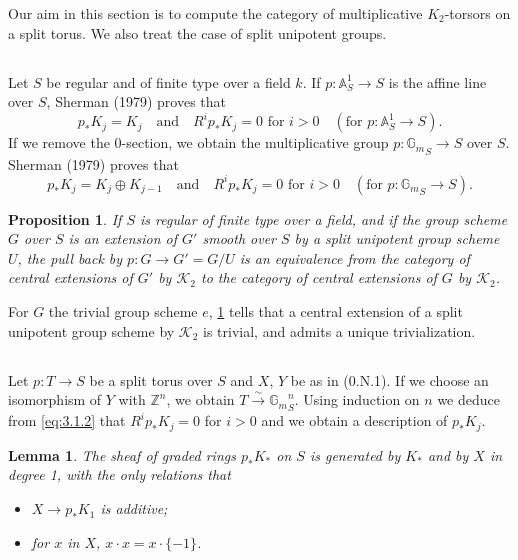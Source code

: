 \documentclass[11pt,a4paper]{article}
\theoremstyle{plain}
\newtheorem{lemma}[theorem]{Lemma}
\newtheorem{proposition}[theorem]{Proposition}
\theoremstyle{definition}
\newcommand{\cK}{\mathcal{K}}
\newcommand{\bA}{\mathbb{A}}
\newcommand{\bZ}{\mathbb{Z}}
\newcommand{\Gm}{{\mathbb{G}_m}}
\begin{document}
Our aim in this section is to compute the category of multiplicative $K_2$-torsors on a split torus. We also treat the case of split unipotent groups.

\subsection{}
Let $S$ be regular and of finite type over a field $k$. If $p: \bA^1_S \to S$ is the affine line over $S$, Sherman (1979) proves that
\begin{equation}\label{eq:3.1.1}
p_* K_j = K_j \quad \text{and} \quad R^i p_* K_j = 0 \text{ for } i > 0 \quad (\text{for } p: \bA^1_S \to S).
\end{equation}
If we remove the 0-section, we obtain the multiplicative group $p: \Gm_S \to S$ over $S$. Sherman (1979) proves that
\begin{equation}\label{eq:3.1.2}
p_* K_j = K_j \oplus K_{j-1} \quad \text{and} \quad R^i p_* K_j = 0 \text{ for } i > 0 \quad (\text{for } p: \Gm_S \to S).
\end{equation}

\begin{proposition}\label{prop:3.2}
If $S$ is regular of finite type over a field, and if the group scheme $G$ over $S$ is an extension of $G'$ smooth over $S$ by a split unipotent group scheme $U$, the pull back by $p: G \to G' = G/U$ is an equivalence from the category of central extensions of $G'$ by $\cK_2$ to the category of central extensions of $G$ by $\cK_2$.
\end{proposition}

For $G$ the trivial group scheme $e$, \ref{prop:3.2} tells that a central extension of a split unipotent group scheme by $\cK_2$ is trivial, and admits a unique trivialization.

\subsection{}
Let $p: T \to S$ be a split torus over $S$ and $X$, $Y$ be as in (0.N.1). If we choose an isomorphism of $Y$ with $\bZ^n$, we obtain $T \xrightarrow{\sim} \Gm_S^n$. Using induction on $n$ we deduce from \eqref{eq:3.1.2} that $R^i p_* K_j = 0$ for $i > 0$ and we obtain a description of $p_* K_j$.

\begin{lemma}\label{lem:3.3.1}
The sheaf of graded rings $p_* K_*$ on $S$ is generated by $K_*$ and by $X$ in degree 1, with the only relations that
\begin{itemize}
\item[(i)] $X \to p_* K_1$ is additive;
\item[(ii)] for $x$ in $X$, $x \cdot x = x \cdot \{-1\}$.
\end{itemize}
\end{lemma}
\end{document}
